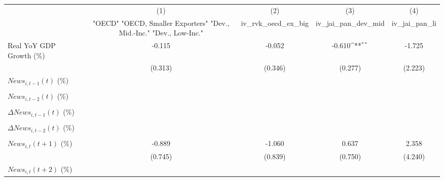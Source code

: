 {
\def\sym#1{\ifmmode^{#1}\else\(^{#1}\)\fi}
\begin{tabular}{l*{4}{c}}
\toprule
                    &\multicolumn{1}{c}{(1)}&\multicolumn{1}{c}{(2)}&\multicolumn{1}{c}{(3)}&\multicolumn{1}{c}{(4)}\\
                    &\multicolumn{1}{c}{ "OECD" "OECD, Smaller Exporters" "Dev., Mid.-Inc." "Dev., Low-Inc."}&\multicolumn{1}{c}{iv_rvk_oecd_ex_big}&\multicolumn{1}{c}{iv_jai_pan_dev_mid}&\multicolumn{1}{c}{iv_jai_pan_li}\\
\midrule
Real YoY GDP Growth (\%)&      -0.115         &      -0.052         &      -0.610\sym{**} &      -1.725         \\
                    &     (0.313)         &     (0.346)         &     (0.277)         &     (2.223)         \\
\addlinespace
$ News_{i,t-1}(t)$ (\%)&                     &                     &                     &                     \\
                    &                     &                     &                     &                     \\
\addlinespace
$ News_{i,t-2}(t)$ (\%)&                     &                     &                     &                     \\
                    &                     &                     &                     &                     \\
\addlinespace
$ \Delta News_{i,t-1}(t)$ (\%)&                     &                     &                     &                     \\
                    &                     &                     &                     &                     \\
\addlinespace
$ \Delta News_{i,t-2}(t)$ (\%)&                     &                     &                     &                     \\
                    &                     &                     &                     &                     \\
\addlinespace
$ News_{i,t}(t+1)$ (\%)&      -0.889         &      -1.060         &       0.637         &       2.358         \\
                    &     (0.745)         &     (0.839)         &     (0.750)         &     (4.240)         \\
\addlinespace
$ News_{i,t}(t+2)$ (\%)&                     &                     &                     &                     \\

\end{tabular}}
